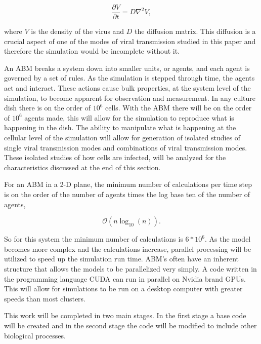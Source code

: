 \documentclass[a4paper]{article}
\begin{document}
$$\frac{\partial V}{\partial t}=D \nabla^{2}V,$$

\noindent
where $V$ is the density of the virus and $D$ the diffusion matrix. This diffusion is a crucial aspect of one of the modes of viral transmission studied in this paper and therefore the simulation would be incomplete without it.

An ABM breaks a system down into smaller units, or agents, and each agent is governed by a set of rules. As the simulation is stepped through time, the agents act and interact.  These actions cause bulk properties, at the system level of the simulation, to become apparent for observation and measurement. In any culture dish \cite{website1} there is on the order of $10^6$ cells. With the ABM there will be on the order of $10^6$ agents made, this will allow for the simulation to reproduce what is happening in the dish. The ability to manipulate what is happening at the cellular level of the simulation will allow for generation of isolated studies of single viral transmission modes and combinations of viral transmission modes. These isolated studies of how cells are infected, will be analyzed for the characteristics discussed at the end of this section.

For an ABM in a 2-D plane, the minimum number of calculations per time step is on the order of the number of agents times the log base ten of the number of agents, 

$$\mathcal{O}(n\log_{10} (n)).$$

\noindent
So for this system the minimum number of calculations is $6*10^6$. As the model becomes more complex and the calculations increase, parallel processing will be utilized to speed up the simulation run time. ABM's often have an inherent structure that allows the models to be parallelized very simply. A code written in the programming language CUDA can run in parallel on Nvidia brand GPUs. This will allow for simulations to be run on a desktop computer with greater speeds than most clusters.

%
This work will be completed in two main stages. In the first stage a base code will be created and in the second stage the code will be modified to include other biological processes.
\end{document}
